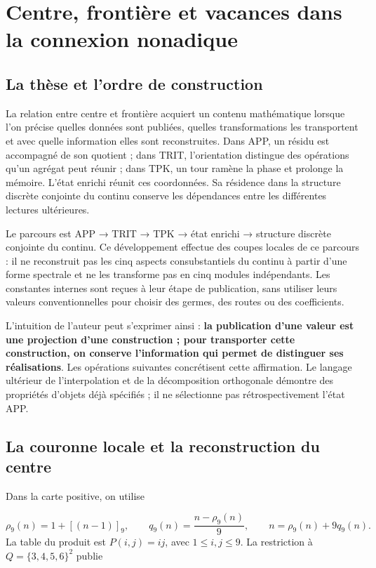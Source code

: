 \section{Centre, frontière et vacances dans la connexion nonadique}
\label{viii:sec:centro-frontera}
\subsection{La thèse et l'ordre de construction}
La relation entre centre et frontière acquiert un contenu mathématique lorsque l'on précise quelles données sont publiées, quelles transformations les transportent et avec quelle information elles sont reconstruites. Dans APP, un résidu est accompagné de son quotient ; dans TRIT, l'orientation distingue des opérations qu'un agrégat peut réunir ; dans TPK, un tour ramène la phase et prolonge la mémoire. L'état enrichi réunit ces coordonnées. Sa résidence dans la structure discrète conjointe du continu conserve les dépendances entre les différentes lectures ultérieures.

Le parcours est APP → TRIT → TPK → état enrichi → structure discrète conjointe du continu. Ce développement effectue des coupes locales de ce parcours : il ne reconstruit pas les cinq aspects consubstantiels du continu à partir d'une forme spectrale et ne les transforme pas en cinq modules indépendants. Les constantes internes sont reçues à leur étape de publication, sans utiliser leurs valeurs conventionnelles pour choisir des germes, des routes ou des coefficients.

L'intuition de l'auteur peut s'exprimer ainsi : \textbf{la publication d'une valeur est une projection d'une construction ; pour transporter cette construction, on conserve l'information qui permet de distinguer ses réalisations}. Les opérations suivantes concrétisent cette affirmation. Le langage ultérieur de l'interpolation et de la décomposition orthogonale démontre des propriétés d'objets déjà spécifiés ; il ne sélectionne pas rétrospectivement l'état APP.

\subsection{La couronne locale et la reconstruction du centre}
Dans la carte positive, on utilise

\[
\rho_9(n)=1+[(n-1)]_9,\qquad
q_9(n)=\frac{n-\rho_9(n)}9,
\qquad n=\rho_9(n)+9q_9(n).
\]
La table du produit est \(P(i,j)=ij\), avec \(1\leq i,j\leq9\). La restriction à \(Q=\{3,4,5,6\}^2\) publie

